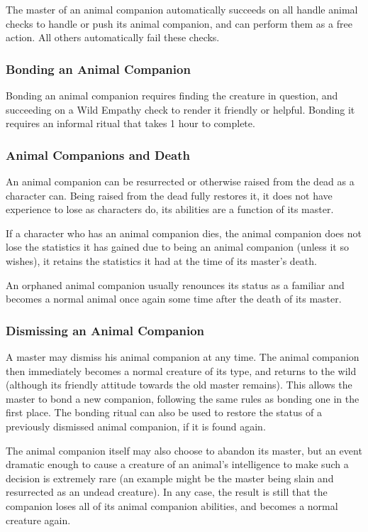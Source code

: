 The master of an animal companion automatically succeeds on all handle animal checks to handle or push its animal companion, 
and can perform them as a free action.
All others automatically fail these checks.
\subsubsection{Bonding an Animal Companion}
Bonding an animal companion requires finding the creature in question, and succeeding on a Wild Empathy check to render it friendly or helpful.
Bonding it requires an informal ritual that takes 1 hour to complete.
\subsubsection{Animal Companions and Death}
An animal companion can be resurrected or otherwise raised from the dead as a character can. 
Being raised from the dead fully restores it, it does not have experience to lose as characters do, its abilities are a function of its master.

If a character who has an animal companion dies, 
the animal companion does not lose the statistics it has gained due to being an animal companion (unless it so wishes), 
it retains the statistics it had at the time of its master's death.

An orphaned animal companion usually renounces its status as a familiar and becomes a normal animal once again some time after the death of its master.
\subsubsection{Dismissing an Animal Companion}
A master may dismiss his animal companion at any time. 
The animal companion then immediately becomes a normal creature of its type, and returns to the wild 
(although its friendly attitude towards the old master remains).
This allows the master to bond a new companion, following the same rules as bonding one in the first place.
The bonding ritual can also be used to restore the status of a previously dismissed animal companion, if it is found again.

The animal companion itself may also choose to abandon its master, 
but an event dramatic enough to cause a creature of an animal's intelligence to make such a decision is extremely rare
(an example might be the master being slain and resurrected as an undead creature).
In any case, the result is still that the companion loses all of its animal companion abilities, and becomes a normal creature again.
